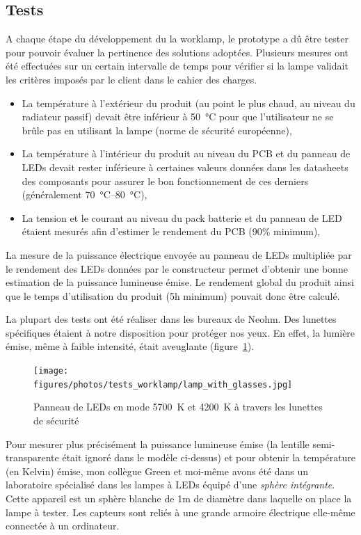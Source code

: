 \documentclass[a4paper, 12pt, sffamily]{report}
\begin{document}
\subsection{Tests}
A chaque étape du développement du la worklamp, le prototype a dû  être tester pour pouvoir évaluer la pertinence des solutions adoptées. Plusieurs mesures ont été effectuées sur un certain intervalle de temps pour vérifier si la lampe validait les critères imposés par le client dans le cahier des charges.
\begin{itemize} %
\item La température à l'extérieur du produit (au point le plus chaud, au niveau du radiateur passif) devait être inférieur à \SI{50}{\celsius} pour que l'utilisateur ne se brûle pas en utilisant la lampe (norme de sécurité européenne),
\item La température à l'intérieur du produit au niveau du PCB et du panneau de LEDs devait rester inférieure à certaines valeurs données dans les datasheets des composants pour assurer le bon fonctionnement de ces derniers (généralement \SIrange{70}{80}{\celsius}),
\item La tension et le courant au niveau du pack batterie et du panneau de LED étaient mesurés afin d'estimer le rendement du PCB (90\% minimum),
\end{itemize}
La mesure de la puissance électrique envoyée au panneau de LEDs multipliée par le rendement des LEDs données par le constructeur permet d'obtenir une bonne estimation de la puissance lumineuse émise. Le rendement global du produit ainsi que le temps d'utilisation du produit (5h minimum) pouvait donc être calculé.

La plupart des tests ont été réaliser dans les bureaux de Neohm. Des lunettes spécifiques étaient à notre disposition pour protéger nos yeux. En effet, la lumière émise, même à faible intensité, était aveuglante (figure~\ref{fig:lamp_with_glasses}).

\begin{figure}[h]
\centering
\texttt{[image: figures/photos/tests\_worklamp/lamp\_with\_glasses.jpg]}
\caption{Panneau de LEDs en mode \SI{5700}{\kelvin} et \SI{4200}{\kelvin} à travers les lunettes de sécurité}
\label{fig:lamp_with_glasses}
\end{figure}

Pour mesurer plus précisément la puissance lumineuse émise (la lentille semi-transparente était ignoré dans le modèle ci-dessus) et pour obtenir la température (en Kelvin) émise, mon collègue Green et moi-même avons été dans un laboratoire spécialisé dans les lampes à LEDs équipé d'une \emph{sphère intégrante}. Cette appareil est un sphère blanche de 1m de diamètre dans laquelle on place la lampe à tester. Les capteurs sont reliés à une grande armoire électrique elle-même connectée à un ordinateur.
\end{document}
